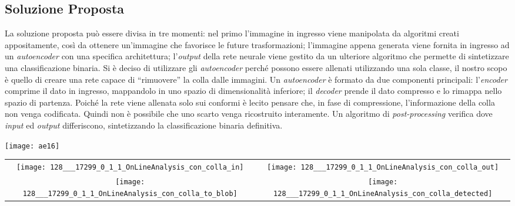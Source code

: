 \documentclass[a0,portrait]{a0poster}
\begin{document}
\begin{multicols}{2}
\section*{Soluzione Proposta}
La soluzione proposta può essere divisa in tre momenti:
nel primo l'immagine in ingresso viene manipolata da algoritmi creati appositamente, così da ottenere un'immagine che favorisce le future trasformazioni;
l'immagine appena generata viene fornita in ingresso ad un \textit{autoencoder} con una specifica architettura;
l'\textit{output} della rete neurale viene gestito da un ulteriore algoritmo che permette di sintetizzare una classificazione binaria.
Si è deciso di utilizzare gli \textit{autoencoder} perché possono essere allenati utilizzando una sola classe, il nostro scopo è quello di creare una rete capace di ``rimuovere'' la colla dalle immagini.
Un \textit{autoencoder} è formato da due componenti principali:
l'\textit{encoder} comprime il dato in ingresso, mappandolo in uno spazio di dimensionalità inferiore;
il \textit{decoder} prende il dato compresso e lo rimappa nello spazio di partenza.
Poiché la rete viene allenata solo sui conformi è lecito pensare che, in fase di compressione, l'informazione della colla non venga codificata.
Quindi non è possibile che uno scarto venga ricostruito interamente.
Un algoritmo di \textit{post-processing} verifica dove \textit{input} ed \textit{output} differiscono, sintetizzando la classificazione binaria definitiva.
\\
[1cm]
\begin{minipage}[c]{0.25\textwidth}
\centering\texttt{[image: ae16]}
    \label{ae}
\end{minipage}
\begin{minipage}[c]{0.29\textwidth}
  \centering
    \begin{tabular}{cc} \label{griglia_fig}
      \texttt{[image: 128\_\_\_17299\_0\_1\_1\_OnLineAnalysis\_con\_colla\_in]} &
      \texttt{[image: 128\_\_\_17299\_0\_1\_1\_OnLineAnalysis\_con\_colla\_out]} \\
      \texttt{[image: 128\_\_\_17299\_0\_1\_1\_OnLineAnalysis\_con\_colla\_to\_blob]} &
      \texttt{[image: 128\_\_\_17299\_0\_1\_1\_OnLineAnalysis\_con\_colla\_detected]}
    \end{tabular}
\end{minipage}



\end{multicols}
\end{document}
